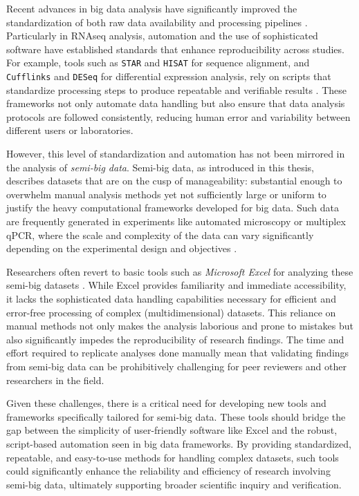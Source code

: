 %
\label{sec:intro_semi_big_data}%
Recent advances in big data analysis have significantly improved the
standardization of both raw data availability and processing pipelines \cite{gomez-cabreroDataIntegrationEra2014}.
Particularly in RNAseq analysis, automation and the use of sophisticated
software have established standards that enhance reproducibility across
studies. For example, tools such as \texttt{STAR} and \texttt{HISAT} for
sequence alignment, and \texttt{Cufflinks} and \texttt{DESeq} for differential
expression analysis, rely on scripts that standardize processing steps to
produce repeatable and verifiable results \cite{dobinSTARUltrafastUniversal2013,
    kimHISATFastSpliced2015,trapnellDifferentialGeneTranscript2012,loveModeratedEstimationFold2014}.
These frameworks not only automate data handling but also ensure that data
analysis protocols are followed consistently, reducing human error and
variability between different users or laboratories.

However, this level of standardization and automation has not been mirrored in
the analysis of \emph{semi-big data}. Semi-big data, as introduced in this thesis,
describes datasets that are on the cusp of manageability: substantial enough to
overwhelm manual analysis methods yet not sufficiently large or uniform to
justify the heavy computational frameworks developed for big
data. Such data are frequently generated in experiments like automated
microscopy or multiplex qPCR, where the scale and complexity of the data can
vary significantly depending on the experimental design and objectives
\cite{krzywinskiMultidimensionalData2013}.

Researchers often revert to basic tools such as \textit{Microsoft Excel} for
analyzing these semi-big datasets \cite{incertiYouStillUsing2019a}. While Excel
provides familiarity and immediate accessibility, it lacks the sophisticated
data handling capabilities necessary for efficient and error-free processing of
complex (multidimensional) datasets. This reliance on manual methods not only
makes the analysis laborious and prone to mistakes but also significantly
impedes the reproducibility of research findings. The time and effort required
to replicate analyses done manually mean that validating findings from semi-big
data can be prohibitively challenging for peer reviewers and other researchers
in the field.

Given these challenges, there is a critical need for developing new tools and
frameworks specifically tailored for semi-big data. These tools should bridge
the gap between the simplicity of user-friendly software like Excel and the
robust, script-based automation seen in big data frameworks. By providing
standardized, repeatable, and easy-to-use methods for handling complex datasets,
such tools could significantly enhance the reliability and efficiency of
research involving semi-big data, ultimately supporting broader scientific
inquiry and verification.





